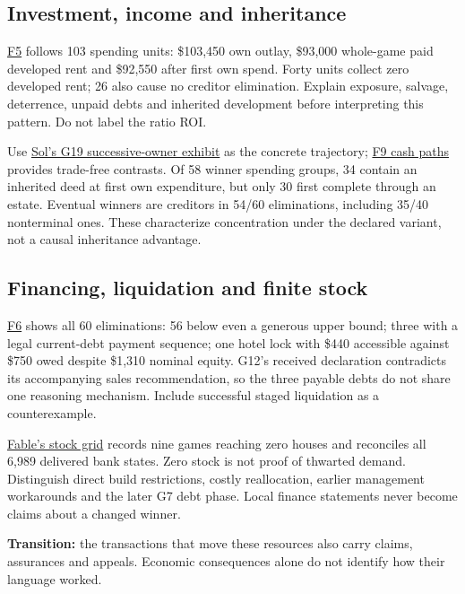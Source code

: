 \subsection{Investment, income and inheritance}
\href{run:../astra/exhibits/f05_spending_and_receipts.png}{F5} follows 103 spending units: \$103,450 own outlay, \$93,000 whole-game paid developed rent and \$92,550 after first own spend. Forty units collect zero developed rent; 26 also cause no creditor elimination. Explain exposure, salvage, deterrence, unpaid debts and inherited development before interpreting this pattern. Do not label the ratio ROI.

Use \href{run:../sol/exhibits/s3_g19_dark_blue.png}{Sol's G19 successive-owner exhibit} as the concrete trajectory; \href{run:../astra/exhibits/f09_cash_trajectories.png}{F9 cash paths} provides trade-free contrasts. Of 58 winner spending groups, 34 contain an inherited deed at first own expenditure, but only 30 first complete through an estate. Eventual winners are creditors in 54/60 eliminations, including 35/40 nonterminal ones. These characterize concentration under the declared variant, not a causal inheritance advantage.

\subsection{Financing, liquidation and finite stock}
\href{run:../astra/exhibits/f06_elimination_financing.png}{F6} shows all 60 eliminations: 56 below even a generous upper bound; three with a legal current-debt payment sequence; one hotel lock with \$440 accessible against \$750 owed despite \$1,310 nominal equity. G12's received declaration contradicts its accompanying sales recommendation, so the three payable debts do not share one reasoning mechanism. Include successful staged liquidation as a counterexample.

\href{run:../fable/exhibits/house_stock_grid.png}{Fable's stock grid} records nine games reaching zero houses and reconciles all 6,989 delivered bank states. Zero stock is not proof of thwarted demand. Distinguish direct build restrictions, costly reallocation, earlier management workarounds and the later G7 debt phase. Local finance statements never become claims about a changed winner.

\textbf{Transition:} the transactions that move these resources also carry claims, assurances and appeals. Economic consequences alone do not identify how their language worked.

